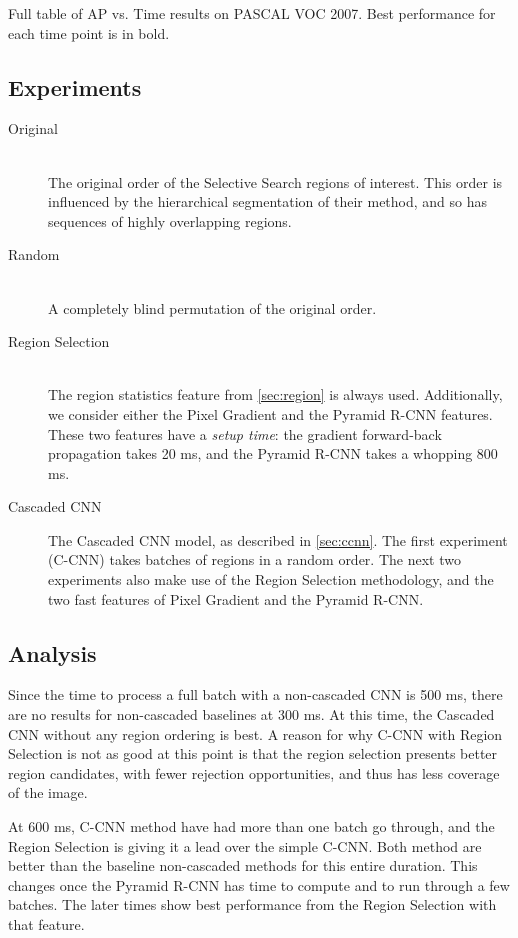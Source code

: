 \begin{table}[ht]
\centering
\caption{
Full table of AP vs. Time results on PASCAL VOC 2007.
Best performance for each time point is in bold.
}\label{tab:results}
\small{

}
\end{table}

\subsection{Experiments}
\begin{description}
  \item[Original] \hfill \\
  The original order of the Selective Search regions of interest.
  This order is influenced by the hierarchical segmentation of their method, and so has sequences of highly overlapping regions.
  \item[Random] \hfill \\
  A completely blind permutation of the original order.
  \item[Region Selection] \hfill \\
  The region statistics feature from \autoref{sec:region} is always used.
  Additionally, we consider either the Pixel Gradient and the Pyramid R-CNN features.
  These two features have a \emph{setup time}: the gradient forward-back propagation takes 20 ms, and the Pyramid R-CNN takes a whopping 800 ms.
  \item[Cascaded CNN]
  The Cascaded CNN model, as described in \autoref{sec:ccnn}.
  The first experiment (C-CNN) takes batches of regions in a random order.
  The next two experiments also make use of the Region Selection methodology, and the two fast features of Pixel Gradient and the Pyramid R-CNN.
\end{description}

\subsection{Analysis}
Since the time to process a full batch with a non-cascaded CNN is 500 ms, there are no results for non-cascaded baselines at 300 ms.
At this time, the Cascaded CNN without any region ordering is best.
A reason for why C-CNN with Region Selection is not as good at this point is that the region selection presents better region candidates, with fewer rejection opportunities, and thus has less coverage of the image.

At 600 ms, C-CNN method have had more than one batch go through, and the Region Selection is giving it a lead over the simple C-CNN.
Both method are better than the baseline non-cascaded methods for this entire duration.
This changes once the Pyramid R-CNN has time to compute and to run through a few batches.
The later times show best performance from the Region Selection with that feature.

